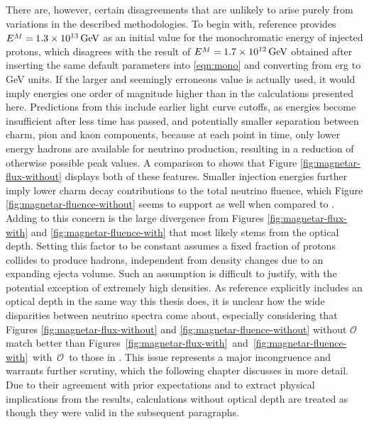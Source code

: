 There are, however, certain disagreements that are unlikely to arise purely from variations in the described methodologies. To begin with,
reference \cite{Carpio_2020} provides $\cramped{E^M} = \kern-0.5pt \smash{\qty{1.3e13}{\giga\electronvolt}}$ as an initial value for the
monochromatic energy of injected protons, which disagrees with the result of
$\cramped{E^M} = \kern-0.5pt \smash{\qty{1.7e12}{\giga\electronvolt}}$
obtained after inserting the same default parameters into \eqref{eqn:mono} and converting from \unit{erg} to \unit{\giga\electronvolt}
units. If the larger and seemingly erroneous value is actually used, it would imply energies one order of magnitude higher than in the
calculations presented here. Predictions from this include earlier light curve cutoffs, as energies become insufficient after less time
has passed, and potentially smaller separation between charm, pion and kaon components, because at each point in time, only lower
energy hadrons are available for neutrino production, resulting in a reduction of otherwise possible peak values. A comparison to
\cite{Carpio_2020} shows that Figure \ref{fig:magnetar-flux-without} displays both of these features. Smaller injection energies
further imply lower charm decay contributions to the total neutrino fluence, which Figure \ref{fig:magnetar-fluence-without} seems
to support as well when compared to \cite{Carpio_2020}. Adding to this concern is the large divergence from Figures
\ref{fig:magnetar-flux-with} and \ref{fig:magnetar-fluence-with} that most likely stems from the optical depth. Setting this
factor to be constant assumes a fixed fraction of protons collides to produce hadrons, independent from density changes
due to an expanding ejecta volume. Such an assumption is difficult to justify, with the potential exception
of extremely high densities. As reference \cite{Carpio_2020} explicitly includes an optical depth in the same way
this thesis does, it is unclear how the wide disparities between neutrino spectra come about, especially
considering that Figures \ref{fig:magnetar-flux-without} and \ref{fig:magnetar-fluence-without} without $\mathscr{O}$ match
better than Figures~\ref{fig:magnetar-flux-with}~and~\ref{fig:magnetar-fluence-with}~with~$\mathscr{O}$~to those in \cite{Carpio_2020}.
This issue represents a major incongruence and warrants further scrutiny, which the following chapter discusses in more detail. Due to their
agreement with prior expectations and to extract physical implications from the results, calculations without optical depth are treated as
though they were valid in the subsequent paragraphs.

